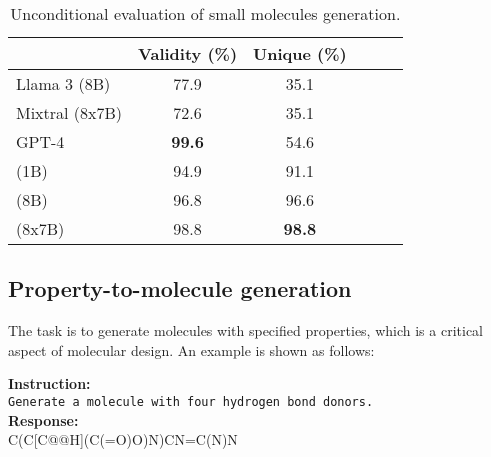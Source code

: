 \begin{table}[!htbp]
\centering
\begin{tabular}{lccccc}
\toprule 
& Validity (\%) & Unique (\%) \\
\midrule
Llama 3 (8B)    & 77.9 & 35.1  \\ 
Mixtral (8x7B) & 72.6 & 35.1  \\
GPT-4          & \textbf{99.6} & 54.6  \\
\midrule
\ourM{} (1B)       & 94.9 & 91.1 \\
\ourM{} (8B)       & 96.8 & 96.6 \\
\ourM{} (8x7B)     & 98.8 & \textbf{98.8} \\
\bottomrule
\end{tabular}
\caption{Unconditional evaluation of small molecules generation.}
\label{tab:unconditional_mol_eval}
\end{table}


\subsection{Property-to-molecule generation}
\label{sec:basic_property_to_mol}
The task is to generate molecules with specified properties, which is a critical aspect of molecular design. An example is shown as follows:
\begin{example}
 \textbf{Instruction: }\\\texttt{Generate a molecule with four hydrogen bond donors.}\\
\textbf{Response: }\\\mol{}C(C[C@@H](C(=O)O)N)CN=C(N)N\emol{}
\end{example}  

